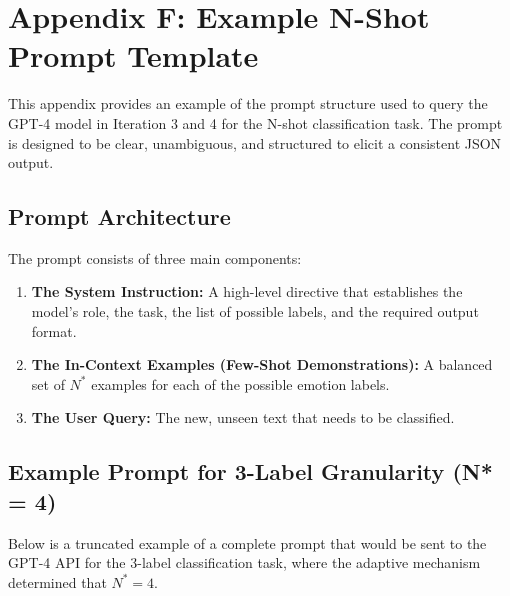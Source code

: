 
\chapter{Appendix F: Example N-Shot Prompt Template}
\label{app:prompt}

This appendix provides an example of the prompt structure used to query the GPT-4 model in Iteration 3 and 4 for the N-shot classification task. The prompt is designed to be clear, unambiguous, and structured to elicit a consistent JSON output.

\section{Prompt Architecture}

The prompt consists of three main components:
\begin{enumerate}
    \item \textbf{The System Instruction:} A high-level directive that establishes the model's role, the task, the list of possible labels, and the required output format.
    \item \textbf{The In-Context Examples (Few-Shot Demonstrations):} A balanced set of $N^*$ examples for each of the possible emotion labels.
    \item \textbf{The User Query:} The new, unseen text that needs to be classified.
\end{enumerate}

\section{Example Prompt for 3-Label Granularity (N* = 4)}

Below is a truncated example of a complete prompt that would be sent to the GPT-4 API for the 3-label classification task, where the adaptive mechanism determined that $N^*=4$.


